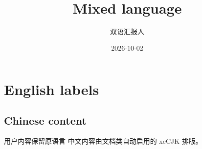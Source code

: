 \documentclass[language=english,cjk=true]{campusbeamer}
\title{Mixed language}
\author{双语汇报人}
\date{2026-10-02}
\begin{document}
\maketitle
\section{English labels}
\subsection{Chinese content}
\begin{frame}{用户内容保留原语言}
  中文内容由文档类自动启用的 xeCJK 排版。
\end{frame}
\end{document}
